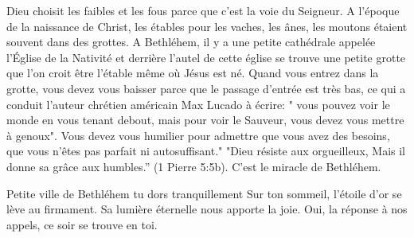 Dieu choisit les faibles et les fous parce que c'est la voie du Seigneur. A l'époque de la naissance de Christ, les étables pour les vaches, les ânes, les moutons étaient souvent dans des grottes. A Bethléhem, il y a une petite cathédrale appelée l'Église de la Nativité et derrière l'autel de cette église se trouve une petite grotte que l'on croit être l'étable même où Jésus est né.
Quand vous entrez dans la grotte, vous devez vous baisser parce que le passage d'entrée est très bas, ce qui a conduit l'auteur chrétien américain Max Lucado à écrire: " vous pouvez voir le monde en vous tenant debout, mais pour voir le Sauveur, vous devez vous mettre à genoux". Vous devez vous humilier pour admettre que vous avez des besoins, que vous n'êtes pas parfait ni autosuffisant." "Dieu résiste aux orgueilleux, Mais il donne sa grâce aux humbles.” (1 Pierre 5:5b). C'est le miracle de Bethléhem.


Petite ville de Bethléhem
tu dors tranquillement
Sur ton sommeil,
l'étoile d'or se lève au firmament.
Sa lumière éternelle
nous apporte la joie.
Oui, la réponse à nos appels,
ce soir se trouve en toi.
